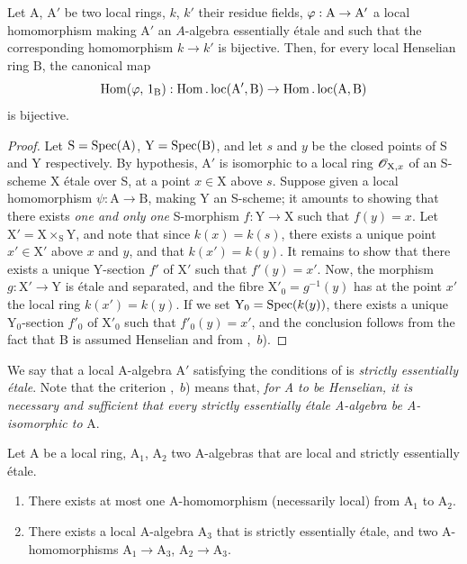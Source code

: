 \begin{lemma}[18.6.2]
\label{IV.18.6.2}
Let $\mathrm{A}$, $\mathrm{A}'$ be two local rings, $k$, $k'$ their residue fields,
$\varphi:\mathrm{A}\to\mathrm{A}'$ a local homomorphism making $\mathrm{A}'$ an $A$-algebra essentially \'{e}tale 
and such that the corresponding homomorphism $k\to k'$ is bijective.
Then, for every local Henselian ring $\mathrm{B}$, the canonical map
\[
  \operatorname{Hom}(\varphi,\,1_{\mathrm{B}}):\operatorname{Hom}.\operatorname{loc}(\mathrm{A}',\mathrm{B})\to\operatorname{Hom}.\operatorname{loc}(\mathrm{A},\mathrm{B})
\]
is bijective.
\end{lemma}

\begin{proof}
Let $\mathrm{S}=\operatorname{Spec}(\mathrm{A})$, $\mathrm{Y}=\operatorname{Spec}(\mathrm{B})$, and let $s$ and $y$ be the closed points of S and Y respectively.
By hypothesis, $\mathrm{A}'$ is isomorphic to a local ring $\mathscr{O}_{\mathrm{X},x}$ of an S-scheme X \'{e}tale over S, at a point $x\in\mathrm{X}$ above $s$.
Suppose given a local homomorphism $\psi:\mathrm{A}\to\mathrm{B}$, making Y an S-scheme;
it amounts to showing that there exists \emph{one and only one} S-morphism $f:\mathrm{Y}\to\mathrm{X}$ such that $f(y)=x$.
Let $\mathrm{X}'=\mathrm{X}\times_{\mathrm{S}}\mathrm{Y}$, and note that since $k(x)=k(s)$, there exists a unique point $x'\in\mathrm{X}'$ above $x$ and $y$, and that $k(x')=k(y)$.
It remains to show that there exists a unique Y-section $f'$ of $\mathrm{X}'$ such that $f'(y)=x'$.
Now, the morphism $g:\mathrm{X}'\to\mathrm{Y}$ is \'{e}tale and separated, and the fibre $\mathrm{X}'_0=g^{-1}(y)$ has at the point $x'$ the local ring $k(x')=k(y)$.
If we set $\mathrm{Y}_0=\operatorname{Spec}(k(y))$, there exists a unique $\mathrm{Y}_0$-section $f'_0$ of $\mathrm{X}'_0$ such that $f'_0(y)=x'$, and the conclusion follows from the fact that B is assumed Henselian and from ,~$b$).
\end{proof}

We say that a local A-algebra $\mathrm{A}'$ satisfying the conditions of  is \emph{strictly essentially \'{e}tale}.
Note that the criterion ,~$b$) means that, \emph{for A to be Henselian, it is necessary and sufficient that every strictly essentially \'{e}tale A-algebra be A-isomorphic to} A.

\begin{lemma}[18.6.3]
\label{IV.18.6.3}
Let $\mathrm{A}$ be a local ring, $\mathrm{A}_1$, $\mathrm{A}_2$ two A-algebras that are local and strictly essentially \'{e}tale.
\begin{enumerate}[label=\emph{\roman*)}]
  \item There exists at most one A-homomorphism (necessarily local) from $\mathrm{A}_1$ to $\mathrm{A}_2$.
  \item There exists a local A-algebra $\mathrm{A}_3$ that is strictly essentially \'{e}tale, and two A-homomorphisms $\mathrm{A}_1\to\mathrm{A}_3$, $\mathrm{A}_2\to\mathrm{A}_3$.
\end{enumerate}
\end{lemma}

